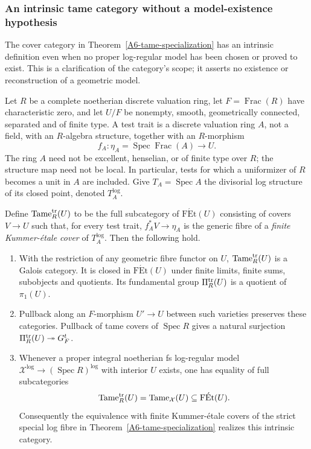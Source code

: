 \subsubsection{An intrinsic tame category without a model-existence hypothesis}

The cover category in Theorem~\ref{A6-tame-specialization} has an
intrinsic definition even when no proper log-regular model has been
chosen or proved to exist. This is a clarification of the category's
scope; it asserts no existence or reconstruction of a geometric model.

\begin{proposition}\label{A6-intrinsic-tame}
Let $R$ be a complete noetherian discrete valuation ring, let
$F=\operatorname{Frac}(R)$ have characteristic zero, and let $U/F$ be
nonempty, smooth, geometrically connected, separated and of finite type.
A test trait is a discrete valuation ring $A$, not a field, with an
$R$-algebra structure, together with an $R$-morphism
\[
 f_A:\eta_A=\operatorname{Spec}\operatorname{Frac}(A)\longrightarrow U.
\]
The ring $A$ need not be excellent, henselian, or of finite type over
$R$; the structure map need not be local. In particular, tests for
which a uniformizer of $R$ becomes a unit in $A$ are included.
Give $T_A=\operatorname{Spec}A$ the divisorial log structure of its
closed point, denoted $T_A^{\log}$.

Define $\operatorname{Tame}^{\rm tr}_R(U)$ to be the full subcategory
of $\operatorname{F\acute Et}(U)$ consisting of covers $V\to U$ such
that, for every test trait, $f_A^*V\to\eta_A$ is the generic fibre of
a \emph{finite Kummer-\'etale cover} of $T_A^{\log}$.
Then the following hold.
\begin{enumerate}
\item With the restriction of any geometric fibre functor on $U$,
 $\operatorname{Tame}^{\rm tr}_R(U)$ is a Galois category. It is closed
 in $\operatorname{F\acute Et}(U)$ under finite limits, finite sums,
 subobjects and quotients. Its fundamental group
 $\Pi^{\rm tr}_R(U)$ is a quotient of $\pi_1(U)$.
\item Pullback along an $F$-morphism $U'\to U$ between such varieties
 preserves these categories. Pullback of tame covers of
 $\operatorname{Spec}R$ gives a natural surjection
 $\Pi^{\rm tr}_R(U)\twoheadrightarrow G_F^t$.
\item Whenever a proper integral noetherian fs log-regular model
 $\mathcal X^{\log}\to(\operatorname{Spec}R)^{\log}$ with interior
 $U$ exists, one has equality of full subcategories
 \[
  \operatorname{Tame}^{\rm tr}_R(U)
     =\operatorname{Tame}_{\mathcal X}(U)
       \subseteq\operatorname{F\acute Et}(U).
 \]
 Consequently the equivalence with finite Kummer-\'etale covers of
 the strict special log fibre in
 Theorem~\ref{A6-tame-specialization} realizes this intrinsic category.
\end{enumerate}
\end{proposition}
